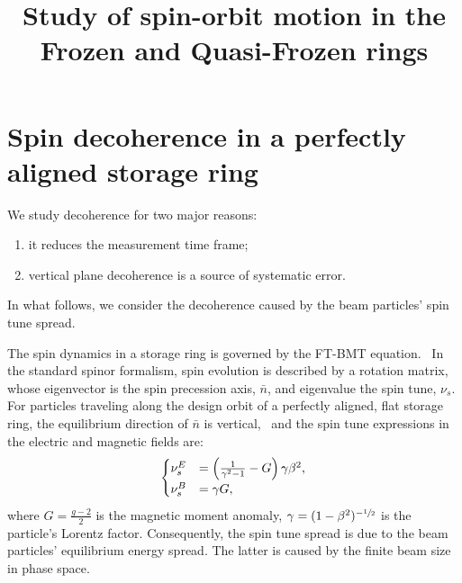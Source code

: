 \documentclass{article}
\newcommand{\st}{\nu_s}
\newcommand{\nbar}{\bar n}
\begin{document}
\title{Study of spin-orbit motion in the Frozen and Quasi-Frozen rings}
\maketitle

\section{Spin decoherence in a perfectly aligned storage ring}

We study decoherence for two major reasons:
\begin{enumerate}
\item it reduces the measurement time frame;
\item vertical plane decoherence is a source of systematic error.~\cite[p. 8]{Senichev:StorageRingMethod}
\end{enumerate}

In what follows, we consider the decoherence caused by the beam particles' spin tune spread.

The spin dynamics in a storage ring is governed by the FT-BMT equation.~\cite[p. 4]{JEDI:SpinTuneMapping} In the standard spinor formalism, spin evolution is described by a rotation matrix, whose eigenvector is the spin precession axis, $\nbar$, and eigenvalue the spin tune, $\st$. For particles traveling along the design orbit of a perfectly aligned, flat storage ring, the equilibrium direction of $\nbar$ is vertical,~\cite[p. 1362]{DESY:SpinTune} and the spin tune expressions in the electric and magnetic fields are:~\cite[p. 8]{Senichev:StorageRingMethod}
\begin{equation}
  \begin{cases}
    \st^E &= \bkt{\frac1{\gamma^2-1}-G}\gamma\beta^2, \\
    \st^B &= \gamma G,
  \end{cases}
\end{equation}
where $G = \frac{g-2}{2}$ is the magnetic moment anomaly, $\gamma = (1-\beta^2)^{-\sfrac12}$ is the particle's Lorentz factor. Consequently, the spin tune spread is due to the beam particles' equilibrium energy spread. The latter is caused by the finite beam size in phase space.
\end{document}
